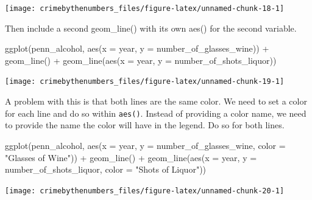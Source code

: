 \documentclass[
  12pt,
]{book}
\newenvironment{Shaded}{\begin{snugshade}}{\end{snugshade}}
\newcommand{\AttributeTok}[1]{\textcolor[rgb]{0.61,0.61,0.61}{#1}}
\newcommand{\FunctionTok}[1]{\textcolor[rgb]{0,0,0}{#1}}
\newcommand{\NormalTok}[1]{#1}
\newcommand{\SpecialCharTok}[1]{\textcolor[rgb]{0,0,0}{#1}}
\newcommand{\StringTok}[1]{\textcolor[rgb]{0.5,0.5,0.5}{#1}}
\begin{document}
\begin{center}\texttt{[image: crimebythenumbers\_files/figure-latex/unnamed-chunk-18-1]} \end{center}

Then include a second geom\_line() with its own aes() for the second variable.

\begin{Shaded}
\begin{Highlighting}[]
\FunctionTok{ggplot}\NormalTok{(penn\_alcohol, }\FunctionTok{aes}\NormalTok{(}\AttributeTok{x =}\NormalTok{ year, }\AttributeTok{y =}\NormalTok{ number\_of\_glasses\_wine)) }\SpecialCharTok{+}
  \FunctionTok{geom\_line}\NormalTok{() }\SpecialCharTok{+}
  \FunctionTok{geom\_line}\NormalTok{(}\FunctionTok{aes}\NormalTok{(}\AttributeTok{x =}\NormalTok{ year, }\AttributeTok{y =}\NormalTok{ number\_of\_shots\_liquor))}
\end{Highlighting}
\end{Shaded}

\begin{center}\texttt{[image: crimebythenumbers\_files/figure-latex/unnamed-chunk-19-1]} \end{center}

A problem with this is that both lines are the same color. We need to set a color for each line and do so within \texttt{aes()}. Instead of providing a color name, we need to provide the name the color will have in the legend. Do so for both lines.

\begin{Shaded}
\begin{Highlighting}[]
\FunctionTok{ggplot}\NormalTok{(penn\_alcohol, }\FunctionTok{aes}\NormalTok{(}\AttributeTok{x =}\NormalTok{ year, }\AttributeTok{y =}\NormalTok{ number\_of\_glasses\_wine,}
                         \AttributeTok{color =} \StringTok{"Glasses of Wine"}\NormalTok{)) }\SpecialCharTok{+}
  \FunctionTok{geom\_line}\NormalTok{() }\SpecialCharTok{+}
  \FunctionTok{geom\_line}\NormalTok{(}\FunctionTok{aes}\NormalTok{(}\AttributeTok{x =}\NormalTok{ year, }\AttributeTok{y =}\NormalTok{ number\_of\_shots\_liquor,}
                \AttributeTok{color =} \StringTok{"Shots of Liquor"}\NormalTok{))}
\end{Highlighting}
\end{Shaded}

\begin{center}\texttt{[image: crimebythenumbers\_files/figure-latex/unnamed-chunk-20-1]} \end{center}
\end{document}
